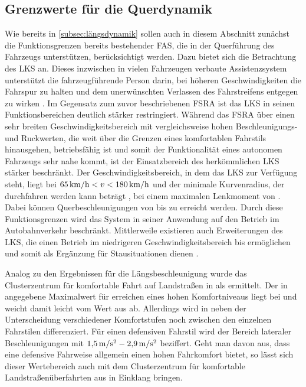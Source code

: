 \subsection{Grenzwerte für die Querdynamik} \label{subsec:querdynamik}
Wie bereits in \ref{subsec:längsdynamik} sollen auch in diesem Abschnitt zunächst die Funktionsgrenzen bereits bestehender \gls{FAS}, die  in der Querführung des Fahrzeugs unterstützen, berücksichtigt werden. Dazu bietet sich die Betrachtung des \gls{LKS} an. Dieses inzwischen in vielen Fahrzeugen verbaute Assistenzsystem unterstützt die fahrzeugführende Person darin, bei höheren Geschwindigkeiten die Fahrspur zu halten und dem unerwünschten Verlassen des Fahrstreifens entgegen zu wirken \cite{Gayko.2012}. Im Gegensatz zum zuvor beschriebenen \gls{FSRA} ist das \gls{LKS} in seinen Funktionsbereichen deutlich stärker restringiert. Während das \gls{FSRA} über einen sehr breiten Geschwindigkeitsbereich mit vergleichsweise hohen Beschleunigungs- und Ruckwerten, die weit über die Grenzen eines komfortablen Fahrstils hinausgehen, betriebsfähig ist und somit der Funktionalität eines autonomen Fahrzeugs sehr nahe kommt, ist der Einsatzbereich des herkömmlichen \gls{LKS} stärker beschränkt. Der Geschwindigkeitsbereich, in dem das \gls{LKS} zur Verfügung steht, liegt bei $65\,\mathrm{km/h}<v<180\,\mathrm{km/h}$ und der minimale Kurvenradius, der durchfahren werden kann beträgt , bei einem maximalen Lenkmoment von  \cite{Gayko.2012}. Dabei können Querbeschleunigungen von bis zu  erreicht werden. Durch diese Funktionsgrenzen wird das System in seiner Anwendung auf den Betrieb im Autobahnverkehr beschränkt. Mittlerweile existieren auch Erweiterungen des \gls{LKS}, die einen Betrieb im niedrigeren Geschwindigkeitsbereich bis  ermöglichen und somit als Ergänzung für Stausituationen dienen \cite{Oschlies.2019}.

Analog zu den Ergebnissen für die Längsbeschleunigung wurde das Clusterzentrum für komfortable Fahrt auf Landstraßen in \cite{Radke.2013} als  ermittelt. Der in \cite{Schwab.2019} angegebene Maximalwert für erreichen eines hohen Komfortniveaus liegt bei  und weicht damit leicht vom Wert aus \cite{Radke.2013} ab. Allerdings wird in \cite{Schwab.2019} neben der Unterscheidung verschiedener Komfortstufen noch zwischen den einzelnen Fahrstilen differenziert. Für einen defensiven Fahrstil wird der Bereich lateraler Beschleunigungen mit $1{,}5\,\mathrm{m/s^2}-2{,}9\,\mathrm{m/s^2}$ beziffert. Geht man davon aus, dass eine defensive Fahrweise allgemein einen hohen Fahrkomfort bietet, so lässt sich dieser Wertebereich auch mit dem Clusterzentrum für komfortable Landstraßenüberfahrten aus \cite{Radke.2013} in Einklang bringen. 

